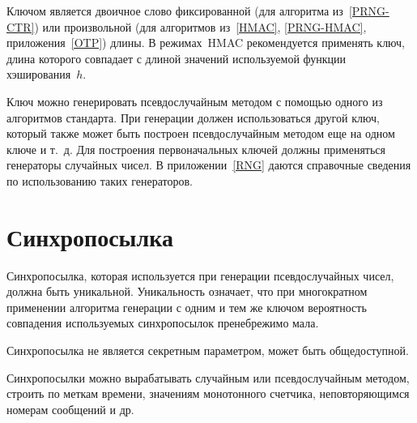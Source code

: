 Ключом является двоичное слово фиксированной 
(для алгоритма из~\ref{PRNG-CTR})
или произвольной 
(для алгоритмов из~\ref{HMAC}, \ref{PRNG-HMAC}, 
приложения~\ref{OTP}) длины.
%
В режимах~HMAC
рекомендуется применять ключ, длина которого совпадает с длиной значений 
используемой функции хэширования~$h$.

Ключ можно генерировать псевдослучайным методом с помощью одного 
из алгоритмов стандарта. При генерации должен использоваться другой 
ключ, который также может быть построен псевдослучайным методом еще
на одном ключе и т.~д. Для построения первоначальных ключей
должны применяться генераторы случайных чисел.
%
В приложении~\ref{RNG} даются справочные сведения по использованию таких 
генераторов. 

\section{Синхропосылка}

Синхропосылка, которая используется при генерации псевдослучайных чисел,
должна быть уникальной.
%
Уникальность означает, что при многократном применении алгоритма генерации 
с одним и тем же ключом вероятность совпадения используемых
синхропосылок пренебрежимо мала.

Синхропосылка не является секретным параметром, может быть общедоступной.

Синхропосылки можно вырабатывать случайным или псевдослучайным 
методом, строить по меткам времени, значениям монотонного счетчика, 
неповторяющимся номерам сообщений и др.

